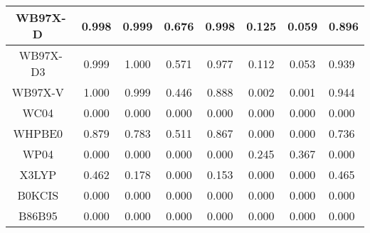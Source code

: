 \begin{tabular}{|c|c|c|c|c|c|c|l|}
                                     WB97X-D~\cite{Chai2008_6615} &                0.998 &                          0.999 &             0.676 &                        0.998 &                0.125 &                0.059 &                       0.896 \\ \hline
                                      WB97X-D3~\cite{Lin2013_263} &                0.999 &                          1.000 &             0.571 &                        0.977 &                0.112 &                0.053 &                       0.939 \\ \hline
                             WB97X-V~\cite{Mardirossian2014_9904} &                1.000 &                          0.999 &             0.446 &                        0.888 &                0.002 &                0.001 &                       0.944 \\ \hline
                                     WC04~\cite{Wiitala2006_1085} &                0.000 &                          0.000 &             0.000 &                        0.000 &                0.000 &                0.000 &                       0.000 \\ \hline
                                       WHPBE0~\cite{Shao2020_587} &                0.879 &                          0.783 &             0.511 &                        0.867 &                0.000 &                0.000 &                       0.736 \\ \hline
                                     WP04~\cite{Wiitala2006_1085} &                0.000 &                          0.000 &             0.000 &                        0.000 &                0.245 &                0.367 &                       0.000 \\ \hline
                                         X3LYP~\cite{Xu2004_2673} &                0.462 &                          0.178 &             0.000 &                        0.153 &                0.000 &                0.000 &                       0.465 \\ \hline
                                 B0KCIS~\cite{Toulouse2002_10465} &                0.000 &                          0.000 &             0.000 &                        0.000 &                0.000 &                0.000 &                       0.000 \\ \hline
                                     B86B95~\cite{Becke1996_1040} &                0.000 &                          0.000 &             0.000 &                        0.000 &                0.000 &                0.000 &                       0.000 \\ \hline

\end{tabular}

